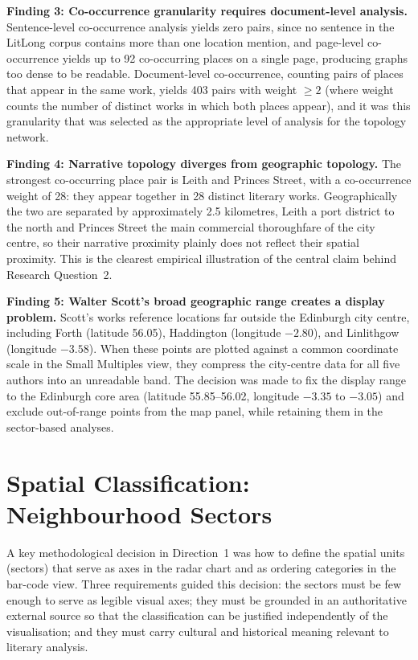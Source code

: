 \documentclass[logo,msc]{infthesis}
\begin{document}
\textbf{Finding 3: Co-occurrence granularity requires document-level analysis.} Sentence-level co-occurrence analysis yields zero pairs, since no sentence in the LitLong corpus contains more than one location mention, and page-level co-occurrence yields up to 92 co-occurring places on a single page, producing graphs too dense to be readable. Document-level co-occurrence, counting pairs of places that appear in the same work, yields 403 pairs with weight $\geq 2$ (where weight counts the number of distinct works in which both places appear), and it was this granularity that was selected as the appropriate level of analysis for the topology network.

\textbf{Finding 4: Narrative topology diverges from geographic topology.} The strongest co-occurring place pair is Leith and Princes Street, with a co-occurrence weight of 28: they appear together in 28 distinct literary works. Geographically the two are separated by approximately 2.5 kilometres, Leith a port district to the north and Princes Street the main commercial thoroughfare of the city centre, so their narrative proximity plainly does not reflect their spatial proximity. This is the clearest empirical illustration of the central claim behind Research Question~2.
 
\textbf{Finding 5: Walter Scott's broad geographic range creates a display problem.} Scott's works reference locations far outside the Edinburgh city centre, including Forth (latitude 56.05), Haddington (longitude $-2.80$), and Linlithgow (longitude $-3.58$). When these points are plotted against a common coordinate scale in the Small Multiples view, they compress the city-centre data for all five authors into an unreadable band. The decision was made to fix the display range to the Edinburgh core area (latitude 55.85--56.02, longitude $-3.35$ to $-3.05$) and exclude out-of-range points from the map panel, while retaining them in the sector-based analyses.
 
\section{Spatial Classification: Neighbourhood Sectors}
\label{sec:sectors}
 
A key methodological decision in Direction~1 was how to define the spatial units (sectors) that serve as axes in the radar chart and as ordering categories in the bar-code view. Three requirements guided this decision: the sectors must be few enough to serve as legible visual axes; they must be grounded in an authoritative external source so that the classification can be justified independently of the visualisation; and they must carry cultural and historical meaning relevant to literary analysis.
 
\end{document}
